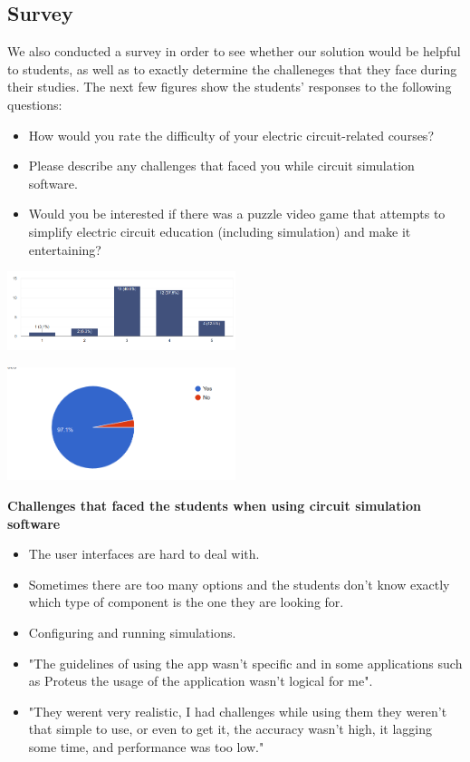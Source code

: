 \documentclass[twoside,a4paper,11pt]{article}
\begin{document}
\begin{multicols}{2}
\subsection{Survey}
We also conducted a survey in order to see whether our solution would be helpful to students, as well as to exactly determine the challeneges that they face during their studies. The next few figures show the students' responses to the following questions:
\begin{itemize}
    \item How would you rate the difficulty of your electric circuit-related courses?
    \item Please describe any challenges that faced you while circuit simulation software.
    \item Would you be interested if there was a puzzle video game that attempts to simplify electric circuit education (including simulation) and make it entertaining? 
\end{itemize} 
\begin{center}
    \includegraphics[width=0.5\textwidth]{Screenshot from 2022-12-17 10-10-45.png}
\end{center}

\begin{center}
    \includegraphics[width=0.5\textwidth]{Screenshot from 2022-12-17 10-11-29.png}
\end{center}

\raggedright\textbf{Challenges that faced the students when using circuit simulation software}
\begin{itemize}
    \item The user interfaces are hard to deal with.
    \item Sometimes there are too many options and the students don't know exactly which type of component is the one they are looking for.
    \item Configuring and running simulations.
    \item "The guidelines of using the app wasn't specific and in some applications such as Proteus the usage of the application wasn't logical for me". 
    \item "They werent very realistic, I had challenges while using them they weren't that simple to use, or even to get it, the accuracy wasn't high, it lagging some time, and performance was too low."
\end{itemize}


\end{multicols}
\end{document}
